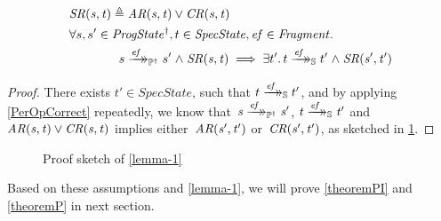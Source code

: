 \begin{lemma}\label{lemma-1}
	\begin{align*}
		&\mathit{SR(s, t)} {}\triangleq{} \mathit{AR(s, t)} \lor \mathit{CR(s, t)}\\
		&\forall s, s' \in \mathit{ProgState^\dagger}, t \in \mathit{SpecState}, \mathit{ef} \in \mathit{Fragment} \ldotp\\
		&\qquad \qquad s \xrightarrow{\mathit{ef}}\mathrel{\mkern-14mu}\rightarrow_{\mathbb P^\dagger} s'  \mathrel\land \mathit{SR(s, t)} \implies \exists t' \ldotp t \xrightarrow{\mathit{ef}}\mathrel{\mkern-14mu}\rightarrow_{\mathbb S} t' \mathrel\land \mathit{SR(s', t')} \\
	\end{align*}
\end{lemma}
	\begin{onehalfspacing}
\begin{proof}
	There exists $t' \in SpecState$, such that $t \xrightarrow{\mathit{ef}}\mathrel{\mkern-14mu}\rightarrow_{\mathbb S} t'$, and by applying \cref{PerOpCorrect} repeatedly, we know that~$\mathit{s \xrightarrow{\mathit{ef}}\mathrel{\mkern-14mu}\rightarrow_{\mathbb P^\dagger} s'}$, $\mathit{t \xrightarrow{\mathit{ef}}\mathrel{\mkern-14mu}\rightarrow_{\mathbb S} t'}$ and~$\mathit{AR(s, t)} \lor \mathit{CR(s, t)}$ implies either~$\mathit{AR(s', t')}$ or~$\mathit{CR(s', t')}$, as sketched in \cref{fig:sketch1}.
\end{proof}
	\end{onehalfspacing}
	\begin{figure} \centering
{}
		\caption{Proof sketch of \cref{lemma-1}}
\label{fig:sketch1}
	\end{figure}
Based on these assumptions and \cref{lemma-1}, we will prove \cref{theoremPI} and \cref{theoremP} in next section.